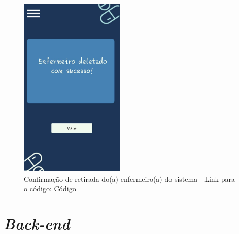 \begin{apendicesenv}
\begin{figure}[H]
    \centering
    \includegraphics[width=5cm]{figuras/Software_Telas_Frontend/front_ConfirmarEnfermeiroDeletado.jpg}
    \caption{Confirmação de retirada do(a) enfermeiro(a) do sistema - Link para o código: \href{https://github.com/PillWatcher/pillwatcher-dpf-service/blob/dev/components/confirmarEnfermeiroDeletado.js}{Código}}
    \label{fig:confirmar_retirada_enfermeiro}
\end{figure}



\section{\textit{Back-end}}


\end{apendicesenv}
